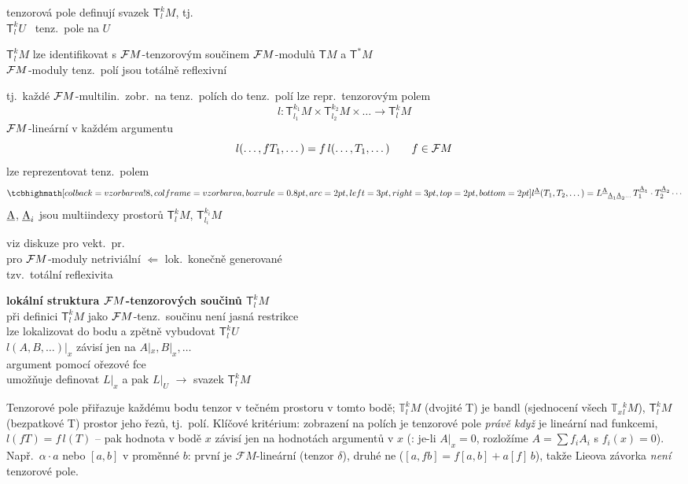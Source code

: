 tenzorová pole definují svazek $\mathsf{T}^k_lM$, tj. \\
\quad $\mathsf{T}^k_lU$ \ tenz.\ pole na $U$

$\mathsf{T}^k_lM$ lze identifikovat s $\mathcal{F} M$-tenzorovým součinem $\mathcal{F} M$-modulů $\mathsf{T}M$ a $\mathsf{T}^*M$ \\
\quad $\mathcal{F} M$-moduly tenz.\ polí jsou totálně reflexivní

\begin{veta}
tj.\ každé $\mathcal{F} M$-multilin.\ zobr.\ na tenz.\ polích do tenz.\ polí lze repr.\ tenzorovým polem
\[
  l: \mathsf{T}^{k_1}_{l_1}M\times\mathsf{T}^{k_2}_{l_2}M\times\dots\to\mathsf{T}^k_lM
\]
\quad $\mathcal{F} M$-lineární v každém argumentu
\[
  l(\dots,fT_1,\dots) = f\,l(\dots,T_1,\dots) \qquad f\in\mathcal{F} M
\]
\quad lze reprezentovat tenz.\ polem
\[
  \vzorec{l^{\gmIpAA}(T_1,T_2,\dots) = L^{\gmIpAA}{}_{\gmIpAA_1\gmIpAA_2\dots}\,T_1^{\gmIpAA_1}\cdot T_2^{\gmIpAA_2}\cdots}
\]
\quad $\underline{\mathrm{A}}$, $\underline{\mathrm{A}}_i$ jsou multiindexy prostorů $\mathsf{T}^k_lM$, $\mathsf{T}^{k_i}_{l_i}M$
\end{veta}
\quad viz diskuze pro vekt.\ pr. \\
\quad pro $\mathcal{F} M$-moduly netriviální $\Leftarrow$ lok.\ konečně generované \\
\quad tzv.\ totální reflexivita

\textbf{lokální struktura $\mathcal{F} M$-tenzorových součinů $\mathsf{T}^k_lM$} \\
\quad při definici $\mathsf{T}^k_lM$ jako $\mathcal{F} M$-tenz.\ součinu není jasná restrikce \\
\quad lze lokalizovat do bodu a zpětně vybudovat $\mathsf{T}^k_lU$ \\
\qquad $l(A,B,\dots)|_x$ závisí jen na $A|_x, B|_x,\dots$ \\
\qquad\quad argument pomocí ořezové fce \\
\quad umožňuje definovat $L|_x$ a pak $L|_U$ $\to$ svazek $\mathsf{T}^k_lM$

\begin{vysvetleni}
Tenzorové pole přiřazuje každému bodu tenzor v tečném prostoru v tomto bodě; $\mathbb T^k_lM$ (dvojité T) je bandl (sjednocení všech $\mathbb T_x{}^k_lM$), $\mathsf T^k_lM$ (bezpatkové T) prostor jeho řezů, tj.\ polí. Klíčové kritérium: zobrazení na polích je tenzorové pole \emph{právě když} je lineární nad funkcemi, $l(fT)=f\,l(T)$ -- pak hodnota v bodě $x$ závisí jen na hodnotách argumentů v $x$ (: je-li $A|_x=0$, rozložíme $A=\sum f_iA_i$ s $f_i(x)=0$). Např.\ $\alpha\cdot a$ nebo $[a,b]$ v proměnné $b$: první je $\mathcal FM$-lineární (tenzor $\delta$), druhé ne ($[a,fb]=f[a,b]+a[f]\,b$), takže Lieova závorka \emph{není} tenzorové pole.
\end{vysvetleni}


